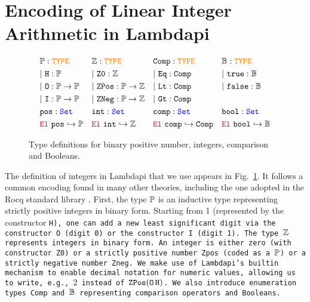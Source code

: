 \section{Encoding of Linear Integer Arithmetic in Lambdapi}
\label{sec:encoding}



\begin{figure}[bt]
\centering
\begin{align*}\label{eq:eq1}
&\mathbb{P}: \textcolor{orange}{\texttt{\upshape{TYPE}}} & &\mathbb{Z}: \textcolor{orange}{\texttt{\upshape{TYPE}}}   & &\texttt{Comp}: \textcolor{orange}{\texttt{\upshape{TYPE}}} & &\mathbb{B}: \textcolor{orange}{\texttt{\upshape{TYPE}}} \\
&|~\texttt{H} : \mathbb{P} & &|~\texttt{Z0}: \mathbb{Z} & &|~\texttt{Eq}: \texttt{Comp} & &|~\texttt{true}: \mathbb{B} \\
&|~\texttt{O}: \mathbb{P} \rightarrow \mathbb{P} & &|~\texttt{ZPos}: \mathbb{P} \rightarrow \mathbb{Z} & &|~\texttt{Lt}: \texttt{Comp} & &|~\texttt{false}: \mathbb{B} \\
&|~\texttt{I}: \mathbb{P} \rightarrow \mathbb{P} & &|~\texttt{ZNeg}: \mathbb{P} \rightarrow \mathbb{Z} & &|~\texttt{Gt}: \texttt{Comp} & &\\
&\texttt{pos}: \textcolor{blue}{\texttt{\upshape{Set}}} & &\texttt{int}: \textcolor{blue}{\texttt{\upshape{Set}}} & &\texttt{comp}: \textcolor{blue}{\texttt{\upshape{Set}}} & &\texttt{bool}: \textcolor{blue}{\texttt{\upshape{Set}}} \\
&\textcolor{purple}{\mathop{\texttt{\upshape{El}}}}~\texttt{pos} \hookrightarrow \mathbb{P} & &\textcolor{purple}{\mathop{\texttt{\upshape{El}}}}~\texttt{int} \hookrightarrow \mathbb{Z} & &\textcolor{purple}{\mathop{\texttt{\upshape{El}}}}~\texttt{comp} \hookrightarrow \texttt{Comp} & &\textcolor{purple}{\mathop{\texttt{\upshape{El}}}}~\texttt{bool} \hookrightarrow \mathbb{B}
\end{align*}
\caption{Type definitions for binary positive number, integers, comparison and Booleans.}
\label{fig:sorts-constructors}
\end{figure}

The definition of integers in Lambdapi that we use appears in Fig.~\ref{fig:sorts-constructors}. It follows a common encoding found in many other theories, including the one adopted in the Rocq standard library \cite{Rocq-refman}.
First, the type $\mathbb{P}$  is an inductive type representing strictly positive integers in binary form.
Starting from 1 (represented by the constructor \tt{H}), one can add a new least significant digit via the constructor \tt{O} (digit 0) or the constructor \tt{I} (digit 1). 
The type $\mathbb{Z}$ represents integers in binary form.
An integer is either zero (with constructor \tt{Z0}) or a strictly positive number \tt{Zpos} (coded as a $\mathbb{P}$) or a strictly negative number \tt{Zneg}.
We make use of Lambdapi's \lstinline[language=Lambdapi,basicstyle=\ttfamily\footnotesize]|builtin| mechanism to enable decimal notation for numeric values, allowing us to write, e.g., $2$ instead of $\mathop{\texttt{ZPos}} (\mathop{\texttt{O}} \texttt{H})$.
%
We also introduce enumeration types \tt{Comp} and $\mathbb{B}$ representing comparison operators and Booleans. 

